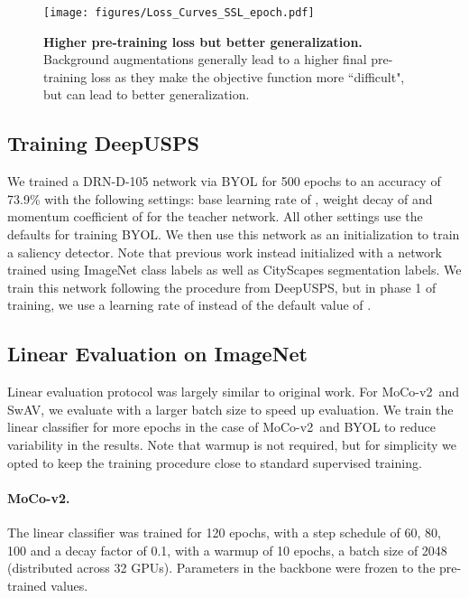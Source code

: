 \documentclass[twoside,11pt]{article}
\newcommand{\moco}{MoCo-v2}
\begin{document}
\begin{figure}
    \centering
    \texttt{[image: figures/Loss\_Curves\_SSL\_epoch.pdf]}
    \caption{\textbf{Higher pre-training loss but better generalization.} Background augmentations generally lead to a higher final pre-training loss as they make the objective function more “difficult", but can lead to better generalization.}
    \label{fig:loss_curves}
\end{figure}

\subsection{Training DeepUSPS\texorpdfstring{}{2}}
\label{app:train_saliency_impl_details}
We trained a DRN-D-105 \citep{drn_yu_2017} network via BYOL for 500 epochs to an accuracy of 73.9\% with the following settings: base learning rate of , weight decay of  and momentum coefficient of  for the teacher network. All other settings use the defaults for training BYOL. We then use this network as an initialization to train a saliency detector. Note that previous work instead initialized with a network trained using ImageNet class labels as well as CityScapes \citep{cordts_cityscapes_2016} segmentation labels. We train this network following the procedure from DeepUSPS, but in phase 1 of training, we use a learning rate of  instead of the default value of .


\subsection{Linear Evaluation on ImageNet}
\label{app:imagenet_lin_eval}
Linear evaluation protocol was largely similar to original work. For \moco~and SwAV, we evaluate with a larger batch size to speed up evaluation. We train the linear classifier for more epochs in the case of \moco~and BYOL to reduce variability in the results. Note that warmup is not required, but for simplicity we opted to keep the training procedure close to standard supervised training.

\paragraph{\moco.} The linear classifier was trained for 120 epochs, with a step schedule of 60, 80, 100 and a decay factor of 0.1, with a warmup of 10 epochs, a batch size of 2048 (distributed across 32 GPUs). Parameters in the backbone were frozen to the pre-trained values.
\end{document}
